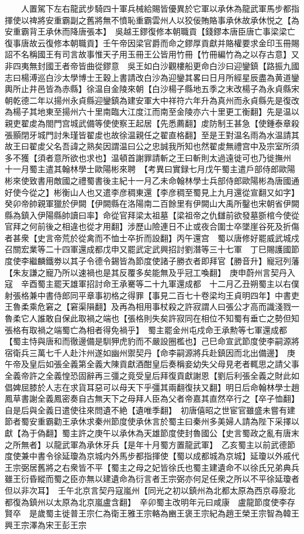 　　人置駕下左右龍武步騎四十軍兵械給賜皆優異於它軍以承休為龍武軍馬步都指揮使以禆將安重霸副之舊將無不憤恥重霸雲州人以狡佞賄賂事承休故承休悦之【為安重霸背王承休而降唐張本】　吳越王鏐復修本朝職貢【錢鏐本唐臣唐亡事梁梁亡復事唐故云復修本朝職貢】壬午帝因梁官爵而命之鏐厚貢獻并賂權要求金印玉冊賜詔不名稱國王有司言故事惟天子用玉冊王公皆用竹冊【竹冊編竹為之以存古意】又非四夷無封國王者帝皆曲從鏐意　吳王如白沙觀樓船更命白沙曰迎鑾鎮【路振九國志曰楊溥巡白沙太學博士王穀上書請改白沙為迎鑾其畧曰日月所經星辰盡為黄道鑾輿所止井邑皆為赤縣】徐温自金陵來朝【白沙楊子縣地五季之末改楊子為永貞縣宋朝乾德二年以揚州永貞縣迎鑾鎮為建安軍大中祥符六年升為真州而永貞縣先是復改為楊子其地東至揚州六十里南臨大江度江而南至金陵亦六十里更工衡翻】先是温以親吏翟䖍為閤門宫城武備等使使察王起居【先悉薦翻】䖍防制王甚急【使鍾泰章殺張顥閉牙城門討朱瑾皆翟䖍也故徐温親任之翟直格翻】至是王對温名雨為水温請其故王曰翟䖍父名吾諱之熟矣因謂温曰公之忠誠我所知也然翟䖍無禮宫中及宗室所須多不獲【須者意所欲也求也】温頓首謝罪請斬之王曰斬則太過遠徙可也乃徙撫州　十一月蜀主遣其翰林學士歐陽彬來聘　【考異曰實録七月戊午蜀主遣戶部侍郎歐陽彬來使致書用敵國之禮蜀書後主紀十一月乙未命翰林學士兵部侍郎歐陽彬為唐國通好使今從之】彬衡山人也又遣李彦稠東還【李彦稠至蜀見上九月還從宣翻又如字】　癸卯帝帥親軍獵於伊闕【伊闕縣在洛陽南二百餘里有伊闕山大禹所鑿也宋朝省伊闕縣為鎮入伊陽縣帥讀曰率】命從官拜梁太祖墓【梁祖帝之仇讎前欲發墓斵棺今使從官拜之何前後之相違也從才用翻】涉歷山險連日不止或夜合圍士卒墜崖谷死及折傷者甚衆【史言帝荒於從禽而不恤士卒折而設翻】丙午還宫　蜀以唐修好罷威武城戍召關宏業等二十四軍還成都戊申又罷武定武興招討劉潛等三十七軍　丁巳賜護國節度使李繼麟鐵劵以其子令德令錫皆為節度使諸子勝衣者即拜官【勝音升】寵冠列藩【朱友謙之寵乃所以速禍也是其反覆多矣能無及乎冠工喚翻】　庚申蔚州言契丹入寇　辛酉蜀主罷天雄軍招討命王承騫等二十九軍還成都　十二月乙丑朔蜀主以右僕射張格兼中書侍郎同平章事初格之得罪【事見二百七十卷梁均王貞明四年】中書吏王魯柔乘危窘之【窘渠隕翻】及再為相用事杖殺之許寂謂人曰張公才高而識淺戮一魯柔它人誰敢自保此取禍之端也【張格則失矣許寂同在相位不知蜀有垂亡之勢但知張格有取禍之端蜀亡為相者得免禍乎】　蜀主罷金州屯戍命王承勲等七軍還成都【蜀主恃與唐和而徹邊備是馴狎虎豹而不嚴設圈檻也】己巳命宣武節度使李嗣源將宿衛兵三萬七千人赴汴州遂如幽州禦契丹【命李嗣源將兵赴鎮因而北出備邊】　庚午帝及皇后如張全義第全義大陳貢獻酒酣皇后奏稱妾幼失父母見老者輒思之請父事全義帝許之全義惶恐固辭再三彊之竟受皇后拜復貢獻謝恩【劉后利張全義之財此如倡婢屈膝於人志在求貨耳惡可以母天下乎彊其兩翻復扶又翻】明日后命翰林學士趙鳳草書謝全義鳳密奏自古無天下之母拜人臣為父者帝嘉其直然卒行之【卒子恤翻】自是后與全義日遣使往來問遺不絶【遺唯季翻】　初唐僖昭之世宦官雖盛未嘗有建節者蜀安重霸勸王承休求秦州節度使承休言於蜀主曰秦州多美婦人請為陛下采擇以獻【為于偽翻】蜀主許之庚午以承休為天雄節度使封魯國公【史言蜀政之亂有唐末之所無者】以龍武軍為承休牙兵【是年十月蜀方置龍武軍】　乙亥蜀主以前武德節度使兼中書令徐延瓊為京城内外馬步都指揮使【蜀以成都城為京城】延瓊以外戚代王宗弼居舊將之右衆皆不平【蜀主之母之妃皆徐氏也蜀主建遺命不以徐氏兄弟典兵雖王衍昏縱而蜀之臣亦無以建遺命為衍言者王宗弼亦何足任衆之所以不平徐延瓊者但以非次耳】　壬午北京言契丹寇嵐州【同光之初以鎮州為北都太原為西京尋廢北都復為鎮州以太原為北京嵐盧含翻】　辛卯蜀主改明年元曰咸康　盧龍節度使李存賢卒　是歲蜀主徙普王宗仁為衛王雅王宗輅為豳王褒王宗紀為趙王榮王宗智為韓王興王宗澤為宋王彭王宗